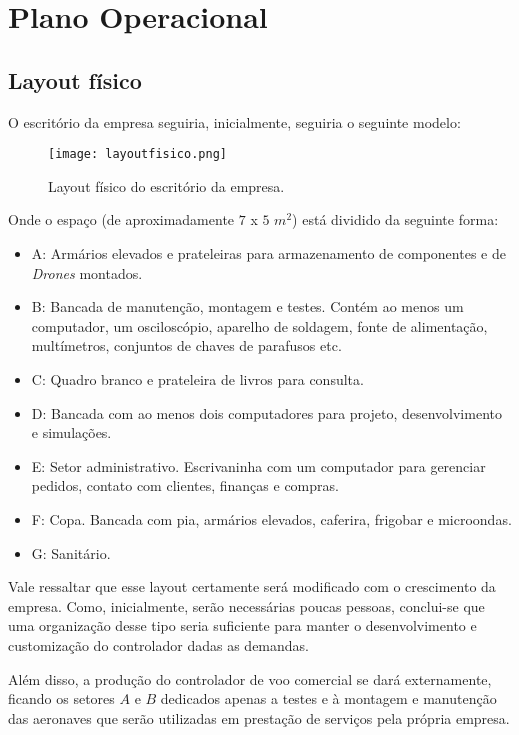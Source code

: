 \section{Plano Operacional}

\subsection{Layout físico}

O escritório da empresa seguiria, inicialmente, seguiria o seguinte
modelo:

\begin{figure}[H]
\centering
\texttt{[image: layoutfisico.png]}
\caption{Layout físico do escritório da empresa.}
\label{fig:layoutfisico}
\end{figure}

Onde o espaço (de aproximadamente $7$ x $5$ $m^2$) está dividido
da seguinte forma:

\begin{itemize}
	\item A: Armários elevados e prateleiras para armazenamento de 
	componentes e de \emph{Drones} montados.
	\item B: Bancada de manutenção, montagem e testes. Contém ao 
	menos um computador, um osciloscópio, aparelho de soldagem, 
	fonte de alimentação, multímetros, conjuntos de chaves de 
	parafusos etc.
	\item C: Quadro branco e prateleira de livros para consulta.
	\item D: Bancada com ao menos dois computadores para projeto,
	desenvolvimento e simulações.
	\item E: Setor administrativo. Escrivaninha com um computador
	para gerenciar pedidos, contato com clientes, finanças e 
	compras.
	\item F: Copa. Bancada com pia, armários elevados, caferira,
	frigobar e microondas.
	\item G: Sanitário.
\end{itemize}

Vale ressaltar que esse layout certamente será modificado com 
o crescimento da empresa. Como, inicialmente, serão necessárias
poucas pessoas, conclui-se que uma organização desse tipo seria
suficiente para manter o desenvolvimento e customização do 
controlador dadas as demandas.

Além disso, a produção do controlador de voo comercial se dará 
externamente, ficando os setores $A$ e $B$ dedicados apenas a 
testes e à montagem e manutenção das aeronaves que serão utilizadas 
em prestação de serviços pela própria empresa.

